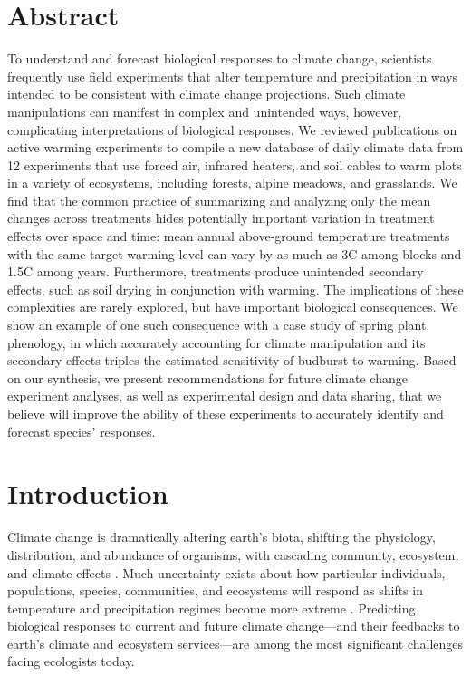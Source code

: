 \documentclass{article}
\begin{document}

\linenumbers

\section* {Abstract} 
\par To understand and forecast biological responses to climate change, scientists frequently use field experiments that alter temperature and precipitation in ways intended to be consistent with climate change projections. Such climate manipulations can manifest in complex and unintended ways, however, complicating interpretations of biological responses. We reviewed publications on active warming experiments to compile a new database of daily climate data from 12 experiments that use forced air, infrared heaters, and soil cables to warm plots in a variety of ecosystems, including forests, alpine meadows, and grasslands.
We find that the common practice of summarizing and analyzing only the mean changes across treatments hides potentially important variation in treatment effects over space and time: mean annual above-ground temperature treatments with the same target warming level can vary by as much as 3\degree C among blocks and 1.5\degree C among years.  %
 Furthermore, treatments produce unintended secondary effects, such as soil drying in conjunction with warming. The implications of these complexities are rarely explored, but have important biological consequences. We show an example of one such consequence with a case study of spring plant phenology, in which accurately accounting for climate manipulation and its secondary effects triples the estimated sensitivity of budburst to warming. Based on our synthesis, we present recommendations for future climate change experiment analyses, as well as experimental design and data sharing, that we believe will improve the ability of these experiments to accurately identify and forecast species' responses.
\section* {Introduction}
\par Climate change is dramatically altering earth's biota, shifting the physiology, distribution, and abundance of organisms, with cascading community, ecosystem, and climate effects \citep{shukla1982,cox2000,thomas2004,parmesan2006,field2007,sheldon2011,urban2012}. Much uncertainty exists about how particular individuals, populations, species, communities, and ecosystems will respond as shifts in temperature and precipitation regimes become more extreme \citep{thuiller2004,friedlingstein2014}.
Predicting biological responses to current and future climate change---and their feedbacks to earth's climate and ecosystem services---are among the most significant challenges facing ecologists today.
\end{document}
